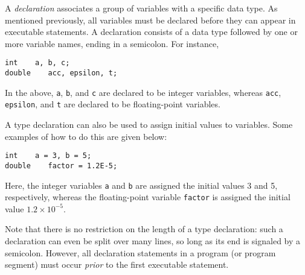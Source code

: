 {{A {\em declaration}\/ associates a group of variables with a specific data
type. As mentioned previously, all variables must be declared before they can appear in executable
statements. A declaration consists of a data type followed by one or more
variable names, ending in a semicolon. For instance,
{\small\begin{verbatim}
int    a, b, c;
double    acc, epsilon, t;
\end{verbatim}}\noindent
In the above, {\tt a}, {\tt b}, and {\tt c} are declared to be integer
variables, whereas {\tt acc}, {\tt epsilon}, and {\tt t} are declared to
be floating-point variables. 

A type declaration can also be used to
assign initial values to variables.
Some examples of how to do this are given below:
{\small\begin{verbatim}
int    a = 3, b = 5;
double    factor = 1.2E-5;
\end{verbatim}}\noindent
Here, the integer variables {\tt a} and {\tt b} are assigned the initial
values 3 and 5, respectively, whereas the floating-point variable
{\tt factor} is assigned the initial value $1.2\times 10^{-5}$. 

Note that there is no restriction on the length of a type declaration:
such a  declaration can even be split over many lines,
 so long as its end is signaled by a
semicolon. However, all declaration statements in a program (or program segment) must
occur {\em prior}\/ to the first executable statement.

}}
